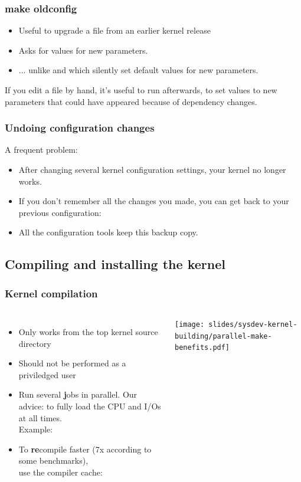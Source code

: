 \begin{frame}
  \frametitle{make oldconfig}
  \begin{itemize}
  \item Useful to upgrade a  file from an earlier kernel release
  \item Asks for values for new parameters.
  \item ... unlike  and  which silently set
  default values for new parameters.
  \end{itemize}
  If you edit a  file by hand, it's useful
  to run  afterwards, to set values to new
  parameters that could have appeared because of dependency changes.
\end{frame}

\begin{frame}
  \frametitle{Undoing configuration changes}
  A frequent problem:
  \begin{itemize}
  \item After changing several kernel configuration settings, your
    kernel no longer works.
  \item If you don't remember all the changes you made,
    you can get back to your previous configuration:\\
  \item All the configuration tools keep this  backup
    copy.
  \end{itemize}
\end{frame}

\subsection{Compiling and installing the kernel}

\begin{frame}[fragile]
  \frametitle{Kernel compilation}
  \begin{columns}
  \begin{itemize}
    \item Only works from the top kernel source directory
    \item Should not be performed as a priviledged user
    \item Run several {\bf j}obs in parallel. Our advice:  to
      fully load the CPU and I/Os at all times.\\
          Example: 
    \item To {\bf re}compile faster (7x according to some benchmarks),\\
	  use the  compiler cache:\\
  \end{itemize}
    \texttt{[image: slides/sysdev-kernel-building/parallel-make-benefits.pdf]}
  \end{columns}
\end{frame}

